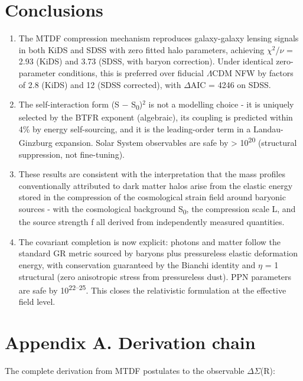 \documentclass[11pt,a4paper]{article}
\begin{document}
\section{Conclusions}
\label{sec:conclusions}
\begin{enumerate}
  \item The MTDF compression mechanism reproduces galaxy-galaxy lensing signals in both KiDS and SDSS with zero fitted halo parameters, achieving $\chi$$^{2}$/$\nu$ = 2.93 (KiDS) and 3.73 (SDSS, with baryon correction). Under identical zero-parameter conditions, this is preferred over fiducial $\Lambda$CDM NFW by factors of 2.8 (KiDS) and 12 (SDSS corrected), with $\Delta$AIC = 4246 on SDSS.
  \item The self-interaction form (S $-$ S\textsubscript{0})$^{2}$ is not a modelling choice  -  it is uniquely selected by the BTFR exponent (algebraic), its coupling is predicted within 4\% by energy self-sourcing, and it is the leading-order term in a Landau-Ginzburg expansion. Solar System observables are safe by > 10\textsuperscript{20} (structural suppression, not fine-tuning).
  \item These results are consistent with the interpretation that the mass profiles conventionally attributed to dark matter halos arise from the elastic energy stored in the compression of the cosmological strain field around baryonic sources  -  with the cosmological background S\textsubscript{0}, the compression scale L, and the source strength f all derived from independently measured quantities.
  \item The covariant completion is now explicit: photons and matter follow the standard GR metric sourced by baryons plus pressureless elastic deformation energy, with conservation guaranteed by the Bianchi identity and $\eta$ = 1 structural (zero anisotropic stress from pressureless dust). PPN parameters are safe by 10\textsuperscript{22--25}. This closes the relativistic formulation at the effective field level.
\end{enumerate}

\section{Appendix A. Derivation chain}
\label{sec:appendix-a}
The complete derivation from MTDF postulates to the observable $\Delta$$\Sigma$(R):
\end{document}
